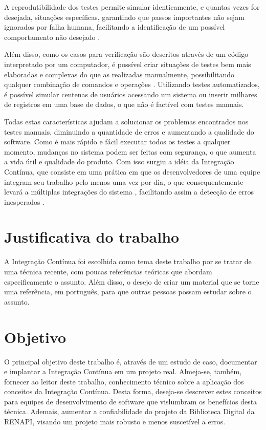 A reprodutibilidade dos testes permite simular identicamente, e quantas vezes for desejada, situações específicas, garantindo que passos importantes não sejam ignorados por falha humana, facilitando a identificação de um possível comportamento não desejado \cite{DELAMARO}.

Além disso, como os casos para verificação são descritos através de um código interpretado por um computador, é possível criar situações de testes bem mais elaboradas e complexas do que as realizadas manualmente, possibilitando qualquer combinação de comandos e operações \cite{DELAMARO}. Utilizando testes automatizados, é possível simular centenas de usuários acessando um sistema ou inserir milhares de registros em uma base de dados, o que não é factível com testes manuais.

Todas estas características ajudam a solucionar os problemas encontrados nos testes manuais, diminuindo a quantidade de erros e aumentando a qualidade do software. Como é mais rápido e fácil executar todos os testes a qualquer momento, mudanças no sistema podem ser feitas com segurança, o que aumenta a vida útil e qualidade do produto. Com isso surgiu a idéia da Integração Contínua, que consiste em uma prática em que os desenvolvedores de uma equipe integram seu trabalho pelo menos uma vez por dia, o que consequentemente levará a múltiplas integrações do sistema \cite{FOWLER}, facilitando assim a detecção de erros inesperados \cite{DUVALL}.

\section{Justificativa do trabalho}

A Integração Contínua foi escolhida como tema deste trabalho por se tratar de uma técnica recente, com poucas referências teóricas que abordam especificamente o assunto. Além disso, o desejo de criar um material que se torne uma referência, em português, para que outras pessoas possam estudar sobre o assunto.

\section{Objetivo}

O principal objetivo deste trabalho é, através de um estudo de caso, documentar e implantar a Integração Contínua em um projeto real. Almeja-se, também, fornecer ao leitor deste trabalho, conhecimento técnico sobre a aplicação dos conceitos da Integração Contínua. Desta forma, deseja-se descrever estes conceitos para equipes de desenvolvimento de software que vislumbram os benefícios desta técnica. Ademais, aumentar a confiabilidade do projeto da Biblioteca Digital da RENAPI, visando um projeto mais robusto e menos suscetível a erros.

